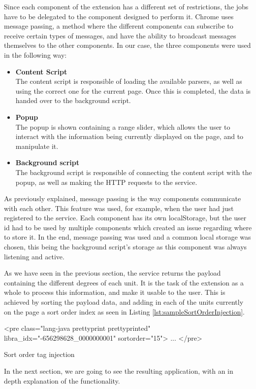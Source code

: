 Since each component of the extension has a different set of restrictions, the jobs have to be delegated to the component designed to perform it. Chrome uses message passing, a method where the different components can subscribe to receive certain types of messages, and have the ability to broadcast messages themselves to the other components. In our case, the three components were used in the following way:
\begin{itemize}
\item \textbf{Content Script}\\
The content script is responsible of loading the available parsers, as well as using the correct one for the current page. Once this is completed, the data is handed over to the background script.
\item \textbf{Popup}\\
The popup is shown containing a range slider, which allows the user to interact with the information being currently displayed on the page, and to manipulate it. 
\item \textbf{Background script}\\
The background script is responsible of connecting the content script with the popup, as well as making the HTTP requests to the service. 
\end{itemize}

As previously explained, message passing is the way components communicate with each other. This feature was used, for example, when the user had just registered to the service. Each component has its own localStorage, but the user id had to be used by multiple components which created an issue regarding where to store it. In the end, message passing was used and a common local storage was chosen, this being the background script's storage as this component was always listening and active.






As we have seen in the previous section, the service returns the payload containing the different degrees of each unit. It is the task of the extension as a whole to process this information, and make it usable to the user. This is achieved by sorting the payload data, and adding in each of the units currently on the page a sort order index as seen in Listing \ref{lst:sampleSortOrderInjection}.
\begin{listing}[H]
\centering
\begin{htmlcode}
<pre class="lang-java prettyprint prettyprinted" libra_idx="-656298628_0000000001" sortorder="15">
	...
</pre>	
\end{htmlcode}
\caption{Sort order tag injection}
\label{lst:sampleSortOrderInjection}
\end{listing}
In the next section, we are going to see the resulting application, with an in depth explanation of the functionality.
